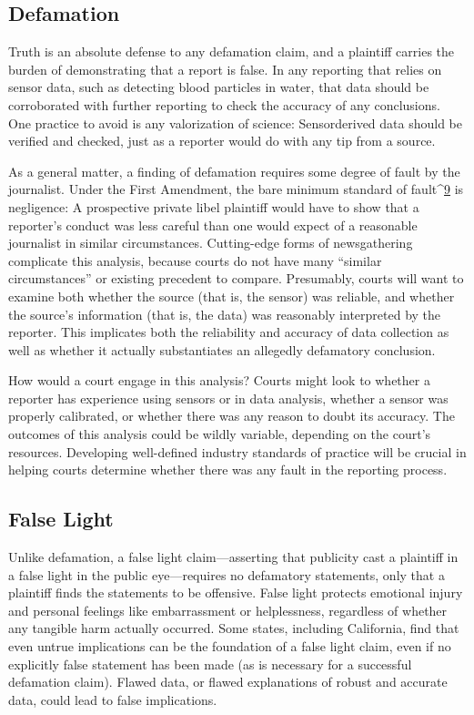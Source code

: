 \subsection{Defamation}
Truth is an absolute defense to any defamation claim, and a plaintiff carries
the burden of demonstrating that a report is false. In any reporting that
relies on sensor data, such as detecting blood particles in water, that data
should be corroborated with further reporting to check the accuracy of any
conclusions. One practice to avoid is any valorization of science: Sensorderived
data should be verified and checked, just as a reporter would do
with any tip from a source.

As a general matter, a finding of defamation requires some degree of fault by
the journalist. Under the First Amendment, the bare minimum standard of
fault^{\href{#endnotes-syed}{9}} is negligence: A prospective private libel plaintiff would have to show
that a reporter's conduct was less careful than one would expect of a reasonable
journalist in similar circumstances. Cutting-edge forms of newsgathering
complicate this analysis, because courts do not have many ``similar
circumstances'' or existing precedent to compare. Presumably, courts will
want to examine both whether the source (that is, the sensor) was reliable,
and whether the source's information (that is, the data) was reasonably
interpreted by the reporter. This implicates both the reliability and accuracy
of data collection as well as whether it actually substantiates an allegedly
defamatory conclusion.

How would a court engage in this analysis? Courts might look to whether
a reporter has experience using sensors or in data analysis, whether a sensor
was properly calibrated, or whether there was any reason to doubt its
accuracy. The outcomes of this analysis could be wildly variable, depending on the court's resources. Developing well-defined industry standards of practice will be crucial in helping courts determine whether there was any
fault in the reporting process.

\subsection{False Light}
Unlike defamation, a false light claim—asserting that publicity cast a plaintiff
in a false light in the public eye—requires no defamatory statements,
only that a plaintiff finds the statements to be offensive. False light protects
emotional injury and personal feelings like embarrassment or helplessness,
regardless of whether any tangible harm actually occurred. Some states,
including California, find that even untrue implications can be the foundation
of a false light claim, even if no explicitly false statement has been made
(as is necessary for a successful defamation claim). Flawed data, or flawed
explanations of robust and accurate data, could lead to false implications.

